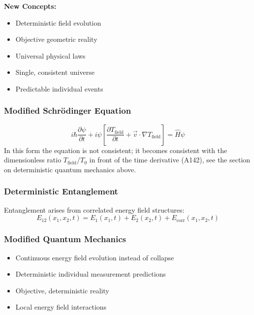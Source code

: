 \textbf{New Concepts:}
\begin{itemize}
	\item Deterministic field evolution
	\item Objective geometric reality
	\item Universal physical laws
	\item Single, consistent universe
	\item Predictable individual events
\end{itemize}

\subsubsection{Modified Schrödinger Equation}

\begin{equation}
	i\hbar\frac{\partial\psi}{\partial t} + i\psi\left[\frac{\partial T_{\text{field}}}{\partial t} + \vec{v} \cdot \nabla T_{\text{field}}\right] = \hat{H}\psi
\end{equation}
In this form the equation is not consistent; it becomes consistent with the dimensionless ratio $T_{\text{field}}/T_0$ in front of the time derivative (A142), see the section on deterministic quantum mechanics above.

\subsubsection{Deterministic Entanglement}

Entanglement arises from correlated energy field structures:
\begin{equation}
	E_{12}(x_1,x_2,t) = E_1(x_1,t) + E_2(x_2,t) + E_{\text{corr}}(x_1,x_2,t)
\end{equation}

\subsubsection{Modified Quantum Mechanics}

\begin{itemize}
	\item Continuous energy field evolution instead of collapse
	\item Deterministic individual measurement predictions
	\item Objective, deterministic reality
	\item Local energy field interactions
\end{itemize}

